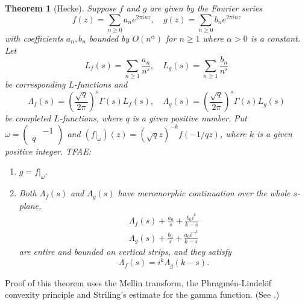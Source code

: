 \documentclass{article}
\newtheorem{theorem}{Theorem}
\newcommand{\smat}[4]{\left(\begin{smallmatrix} #1 & #2 \\ #3 & #4 \end{smallmatrix}\right)}
\begin{document}
\begin{theorem}[Hecke]
Suppose $f$ and $g$ are given by the Fourier series 
$$
f(z) = \sum_{n\geq 0} a_{n}e^{2\pi i n z}, \quad g(z) = \sum_{n\geq 0}b_{n}e^{2\pi i n z}
$$
with coefficients $a_{n}, b_{n}$ bounded by $O(n^{\alpha})$ for $n\geq 1$ where $\alpha >0$ is a constant. Let 
$$
L_{f}(s) = \sum_{n\geq 1}\frac{a_{n}}{n^{s}}, \quad L_{g}(s) = \sum_{n\geq 1} \frac{b_{n}}{n^{s}}
$$
be corresponding $L$-functions and 
$$
\Lambda_{f}(s) = \left(\frac{\sqrt{q}}{2\pi}\right)^{s}\Gamma(s)L_{f}(s), \quad \Lambda_{g}(s) = \left(\frac{\sqrt{q}}{2\pi}\right)^{s}\Gamma(s)L_{g}(s)
$$
be completed $L$-functions, where $q$ is a given positive number. Put $\omega = \smat{}{-1}{q}{}$ and $(f|_{\omega})(z) = (\sqrt{q}z)^{-k} f(-1/qz)$, where $k$ is a given positive integer. TFAE:
\begin{enumerate}
\item $g =f|_{\omega}$. 
\item Both $\Lambda_{f}(s)$ and $\Lambda_{g}(s)$ have meromorphic continuation over the whole $s$-plane, 
\begin{align*}
\Lambda_{f}(s) + \frac{a_{0}}{s} + \frac{b_{0}i^{k}}{k-s} \\
\Lambda_{g}(s) + \frac{b_{0}}{s} + \frac{a_{0}i^{-k}}{k-s}
\end{align*}
are entire and bounded on vertical strips, and they satisfy
$$
\Lambda_{f}(s) = i^{k}\Lambda_{g}(k-s). 
$$
\end{enumerate}
\end{theorem}
Proof of this theorem uses the Mellin transform, the Phragm\'en-Lindel\"of convexity principle and Striling's estimate for the gamma function. (See \cite{iwa}.) 
\end{document}
